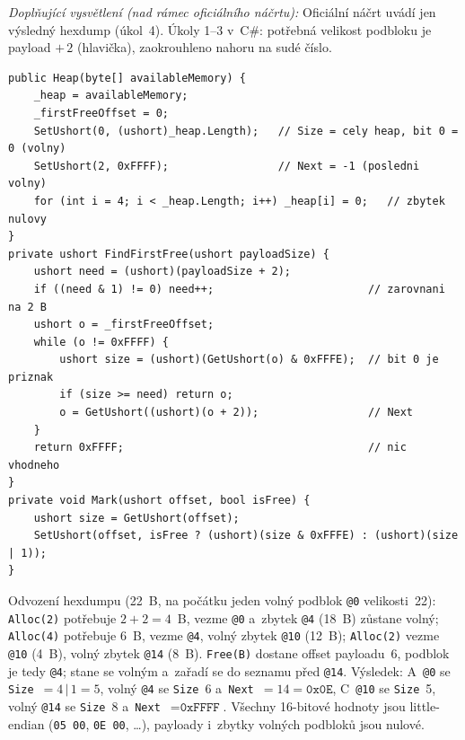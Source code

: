 \medskip
\noindent\textit{Doplňující vysvětlení (nad rámec oficiálního náčrtu):} Oficiální náčrt uvádí jen
výsledný hexdump (úkol~4). Úkoly 1--3 v~C\#: potřebná velikost podbloku je payload $+\,2$ (hlavička),
zaokrouhleno nahoru na sudé číslo.
\begin{lstlisting}[language={[Sharp]C}]
public Heap(byte[] availableMemory) {
    _heap = availableMemory;
    _firstFreeOffset = 0;
    SetUshort(0, (ushort)_heap.Length);   // Size = cely heap, bit 0 = 0 (volny)
    SetUshort(2, 0xFFFF);                 // Next = -1 (posledni volny)
    for (int i = 4; i < _heap.Length; i++) _heap[i] = 0;   // zbytek nulovy
}
private ushort FindFirstFree(ushort payloadSize) {
    ushort need = (ushort)(payloadSize + 2);
    if ((need & 1) != 0) need++;                        // zarovnani na 2 B
    ushort o = _firstFreeOffset;
    while (o != 0xFFFF) {
        ushort size = (ushort)(GetUshort(o) & 0xFFFE);  // bit 0 je priznak
        if (size >= need) return o;
        o = GetUshort((ushort)(o + 2));                 // Next
    }
    return 0xFFFF;                                      // nic vhodneho
}
private void Mark(ushort offset, bool isFree) {
    ushort size = GetUshort(offset);
    SetUshort(offset, isFree ? (ushort)(size & 0xFFFE) : (ushort)(size | 1));
}
\end{lstlisting}
Odvození hexdumpu (22~B, na počátku jeden volný podblok \texttt{@0} velikosti~22):
\texttt{Alloc(2)} potřebuje $2{+}2=4$~B, vezme \texttt{@0} a~zbytek \texttt{@4} (18~B) zůstane volný;
\texttt{Alloc(4)} potřebuje 6~B, vezme \texttt{@4}, volný zbytek \texttt{@10} (12~B); \texttt{Alloc(2)}
vezme \texttt{@10} (4~B), volný zbytek \texttt{@14} (8~B). \texttt{Free(B)} dostane offset payloadu~6,
podblok je tedy \texttt{@4}; stane se volným a~zařadí se do seznamu před \texttt{@14}. Výsledek:
A~\texttt{@0} se \texttt{Size}~$= 4\,|\,1 = 5$, volný \texttt{@4} se \texttt{Size}~6 a~\texttt{Next}~$=14=\texttt{0x0E}$,
C~\texttt{@10} se \texttt{Size}~5, volný \texttt{@14} se \texttt{Size}~8 a~\texttt{Next}~$=\texttt{0xFFFF}$.
Všechny 16-bitové hodnoty jsou little-endian (\texttt{05 00}, \texttt{0E 00}, \dots), payloady i~zbytky
volných podbloků jsou nulové.
